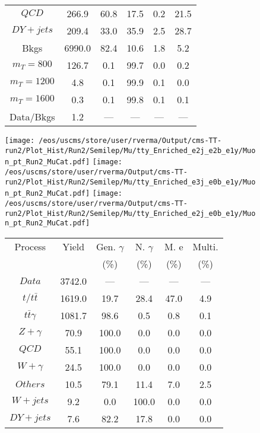 \begin{figure}
\begin{minipage}[c]{0.32\textwidth}
{\begin{tabular}{cccccc}
$ QCD $ &  266.9 &  60.8 &  17.5 &  0.2 &  21.5\\
$ DY+jets $ &  209.4 &  33.0 &  35.9 &  2.5 &  28.7\\
Bkgs &  6990.0 &  82.4 &  10.6 &  1.8 &  5.2\\
$ m_{T} = 800 $ &  126.7 &  0.1 &  99.7 &  0.0 &  0.2\\
$ m_{T} = 1200 $ &  4.8 &  0.1 &  99.9 &  0.1 &  0.0\\
$ m_{T} = 1600 $ &  0.3 &  0.1 &  99.8 &  0.1 &  0.1\\
Data/Bkgs &  1.2 &  --- &  --- &  --- &  ---\\
\hline
\end{tabular}
}
\end{minipage}
\end{figure}

\begin{figure}
\centering
\texttt{[image: /eos/uscms/store/user/rverma/Output/cms-TT-run2/Plot\_Hist/Run2/Semilep/Mu/tty\_Enriched\_e2j\_e2b\_e1y/Muon\_pt\_Run2\_MuCat.pdf]}
\texttt{[image: /eos/uscms/store/user/rverma/Output/cms-TT-run2/Plot\_Hist/Run2/Semilep/Mu/tty\_Enriched\_e3j\_e0b\_e1y/Muon\_pt\_Run2\_MuCat.pdf]}
\texttt{[image: /eos/uscms/store/user/rverma/Output/cms-TT-run2/Plot\_Hist/Run2/Semilep/Mu/tty\_Enriched\_e2j\_e0b\_e1y/Muon\_pt\_Run2\_MuCat.pdf]}
\begin{minipage}[c]{0.32\textwidth}
\centering
\tiny{
\begin{tabular}{cccccc}
\hline
Process & Yield & Gen. $\gamma$ & N. $\gamma$ & M. e & Multi. \\
 &  & (\%) & (\%) & (\%) & (\%)  \\
\hline
                                                                      $ Data $ &  3742.0 &  --- &  --- &  --- &  ---\\
$ t/t\bar{t} $ &  1619.0 &  19.7 &  28.4 &  47.0 &  4.9\\
$ t\bar{t}\gamma $ &  1081.7 &  98.6 &  0.5 &  0.8 &  0.1\\
$ Z+\gamma $ &  70.9 &  100.0 &  0.0 &  0.0 &  0.0\\
$ QCD $ &  55.1 &  100.0 &  0.0 &  0.0 &  0.0\\
$ W+\gamma $ &  24.5 &  100.0 &  0.0 &  0.0 &  0.0\\
$ Others $ &  10.5 &  79.1 &  11.4 &  7.0 &  2.5\\
$ W+jets $ &  9.2 &  0.0 &  100.0 &  0.0 &  0.0\\
$ DY+jets $ &  7.6 &  82.2 &  17.8 &  0.0 &  0.0\\

\end{tabular}}
\end{minipage}
\end{figure}
